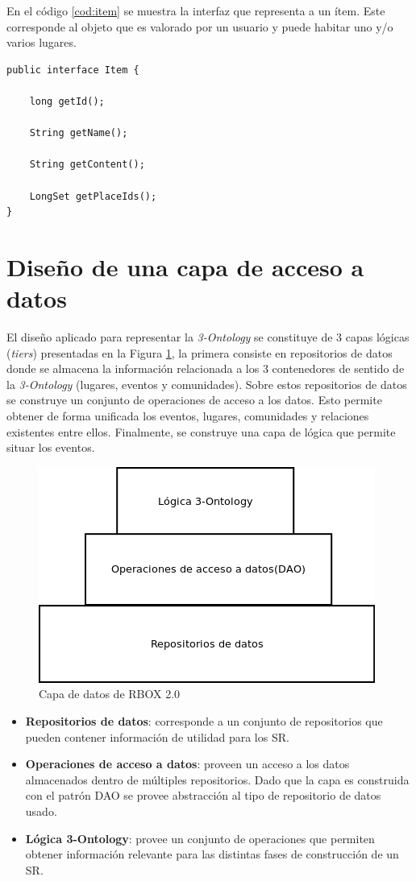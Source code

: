 En el código \ref{cod:item} se muestra la interfaz que representa a un ítem. Este corresponde al objeto que es valorado por un usuario y puede habitar uno y/o varios lugares. 

\begin{lstlisting}[float, caption = Interfaz Item, label = cod:item]
public interface Item {

    long getId();

    String getName();

    String getContent();

    LongSet getPlaceIds();
}
\end{lstlisting}

\section{Diseño de una capa de acceso a datos}

El diseño aplicado para representar la \textit{3-Ontology} se constituye de 3 capas lógicas (\textit{tiers}) presentadas en la Figura \ref{fig:capadatos}, la primera consiste en repositorios de datos donde se almacena la información relacionada a los 3 contenedores de sentido de la \textit{3-Ontology} (lugares, eventos y comunidades). Sobre estos repositorios de datos se construye un conjunto de operaciones de acceso a los datos. Esto permite obtener de forma unificada los eventos, lugares, comunidades y relaciones existentes entre ellos. Finalmente, se construye una capa de lógica que permite situar los eventos.

\begin{figure}[tp]
	\centering
	\includegraphics[scale=.6]{images/capadedatos.png}
	\caption{Capa de datos de RBOX 2.0 }
	\label{fig:capadatos}
\end{figure}

\begin{itemize}
\item \textbf{Repositorios de datos}: corresponde a un conjunto de repositorios que pueden contener información de utilidad para los SR.
\item \textbf{Operaciones de acceso a datos}: proveen un acceso a los datos almacenados dentro de múltiples repositorios. Dado que la capa es construida con el patrón DAO se provee abstracción al tipo de repositorio de datos usado.
\item \textbf{Lógica 3-Ontology}: provee un conjunto de operaciones que permiten obtener información relevante para las distintas fases de construcción de un SR.
\end{itemize}


